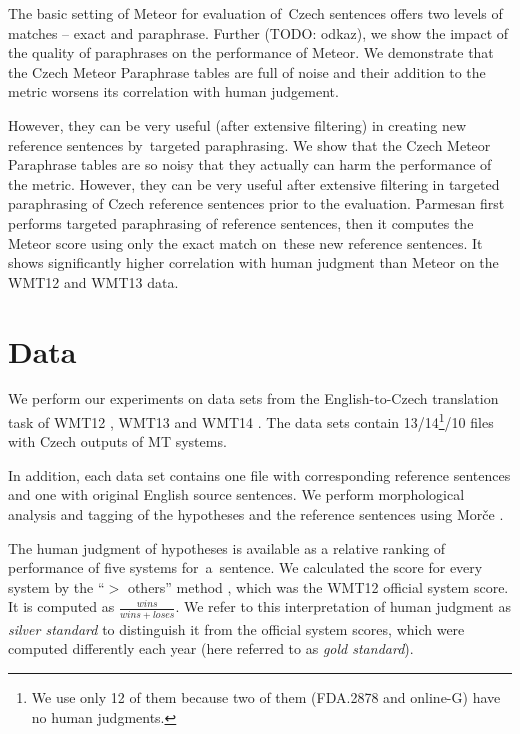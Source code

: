 \documentclass[11pt]{article}
\begin{document}
The basic setting of Meteor for evaluation of~Czech sentences offers two levels of matches -- 
exact and paraphrase. Further (TODO: odkaz), we show the impact of the quality of paraphrases 
on the performance of Meteor. We demonstrate that the Czech Meteor Paraphrase tables are full 
of noise and their addition to the metric worsens its correlation with human judgement. 

However, they can be very useful (after extensive filtering) in creating new reference sentences 
by~targeted paraphrasing. 
We show that the Czech Meteor Paraphrase tables are so noisy that they actually can harm 
the performance of the metric. However, they can be very useful after extensive filtering 
in targeted paraphrasing of Czech reference sentences prior to the evaluation.
Parmesan first performs targeted paraphrasing of reference sentences, then it computes 
the Meteor score using only the exact match on~these new reference sentences. It shows 
significantly higher correlation with human judgment than Meteor on the WMT12 and WMT13 data. 

\section{Data}
We perform our experiments on data sets from the English-to-Czech translation 
task of WMT12 \cite{wmt12}, WMT13 \cite{wmt13} and WMT14 \cite{wmt14}. The data 
sets contain 13/14\footnote{We use only 12 of them because two of them (FDA.2878 
and online-G) have no human judgments.}/10 files with Czech outputs of MT systems.

In addition, each data set contains one file with corresponding reference sentences 
and one with original English source sentences. We perform morphological analysis 
and tagging of the hypotheses and the reference sentences using Morče \cite{morce:2007}.

The human judgment of hypotheses is available as a relative ranking of performance of 
five systems for~a~sentence. We calculated the score for every system by the “$ > $ others” 
method \cite{bojar-grains}, which was the WMT12 official system score. It is computed 
as $ \frac{wins}{wins+loses} $. We refer to this interpretation of human judgment as 
\textit{silver standard} to distinguish it from the official system scores, which were 
computed differently each year (here referred to as \textit{gold standard}).
\end{document}

